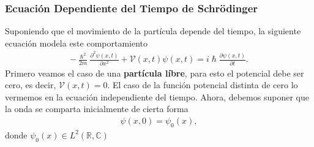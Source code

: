 \documentclass[aspectratio=1610]{beamer}
\newcommand*{\field}[1]{\mathbb{#1}}
\begin{document}
\begin{frame}
\frametitle{Ecuación Dependiente del Tiempo de Schrödinger}

Suponiendo que el movimiento de la partícula depende del tiempo, la siguiente ecuación modela este comportamiento
\begin{align}
    -\frac{\hslash^2}{2m}\frac{\partial^2\psi(x,t)}{\partial x^2} + \mathcal{V}(x,t)\psi(x,t) = i\hslash\frac{\partial\psi(x,t)}{\partial t}.
    \label{eq:ECDepTiemp}
\end{align}
Primero veamos el caso de una \textbf{partícula líbre}, para esto el potencial debe ser cero, es decir, $\mathcal{V}(x,t) = 0$. El caso de la función potencial distinta de cero lo vermemos en la ecuación independiente del tiempo. Ahora, debemos suponer que la onda se comparta inicialmente de cierta forma 
\begin{align*}
    \psi(x,0) = \psi_{0}(x),
\end{align*}
donde $\psi_{0}(x) \in L^{2}(\field{R},\field{C})$

\begin{columns}
\column{37em}
\end{columns}
\end{frame}
\end{document}
